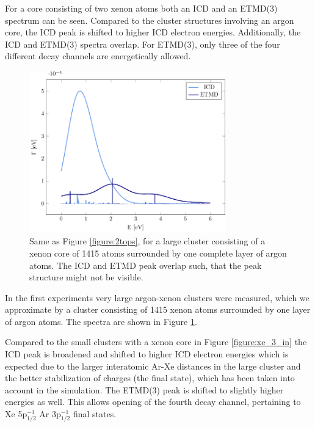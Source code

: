 For a core consisting of two xenon atoms both an ICD and an ETMD(3) spectrum
can be seen. Compared to the cluster structures involving an argon core, the ICD peak is
shifted to higher ICD electron energies. 
Additionally, the ICD and ETMD(3) spectra overlap.
For ETMD(3), only three of the four different decay channels are
energetically allowed.

\begin{figure}[ht]
 \centering
 \includegraphics[width=8.5cm]{pics/xe_8_1lay.pdf}
 \caption{Same as Figure \protect\ref{figure:2tops}, for a large cluster consisting
          of a xenon core of 1415 atoms surrounded by one complete layer of
          argon atoms. The ICD and ETMD peak overlap such, that the peak
          structure might not be visible.}
 \label{figure:xe_8_lay1}
\end{figure}
%
In the first experiments very large argon-xenon clusters were measured,\cite{Mucke_phd}
which we approximate by a cluster consisting of 1415 xenon atoms surrounded
by one layer of argon atoms. The spectra are shown in Figure
\ref{figure:xe_8_lay1}.

Compared to the small clusters with a xenon core in Figure \ref{figure:xe_3_in}
the ICD peak is broadened and shifted to higher ICD electron energies which is
expected due to the larger interatomic Ar-Xe distances in the large cluster and
the better stabilization of charges (the final state), which has been taken into account
in the simulation.
The ETMD(3) peak is shifted to slightly higher energies as well. This allows opening of the
fourth decay channel, pertaining to Xe 5p$_{1/2}^{-1}$ Ar 3p$_{1/2}^{-1}$ final states.
